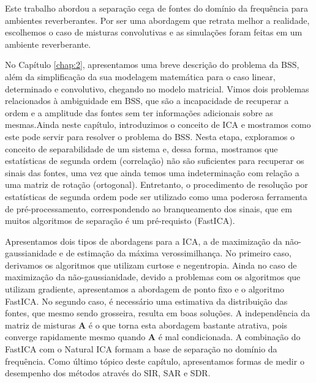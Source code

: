 \label{chap:5}
Este trabalho abordou a separação cega de fontes do domínio da frequência para ambientes reverberantes. Por ser uma abordagem que retrata melhor a realidade, escolhemos o caso de misturas convolutivas e as simulações foram feitas em um ambiente reverberante.

No Capítulo \ref{chap:2}, apresentamos uma breve descrição do problema da BSS, além da simplificação da sua modelagem matemática para o caso linear, determinado e convolutivo, chegando no modelo matricial. Vimos dois problemas relacionados à ambiguidade em BSS, que são a incapacidade de recuperar a ordem e a amplitude das fontes sem ter informações adicionais sobre as mesmas.Ainda neste capítulo, introduzimos o conceito de ICA e mostramos como este pode servir para resolver o problema do BSS. Nesta etapa, exploramos o conceito de separabilidade de um sistema e, dessa forma, mostramos que estatísticas de segunda ordem (correlação) não são suficientes para recuperar os sinais das fontes, uma vez que ainda temos uma indeterminação com relação a uma matriz de rotação (ortogonal). Entretanto, o procedimento de resolução por estatísticas de segunda ordem pode ser utilizado como uma poderosa ferramenta de pré-processamento, correspondendo ao branqueamento dos sinais, que em muitos algoritmos de separação é um pré-requisto (FastICA). 

Apresentamos dois tipos de abordagens para a ICA, a de maximização da não-gaussianidade e de estimação da máxima verossimilhança. No primeiro caso, derivamos os algoritmos que utilizam curtose e negentropia. Ainda no caso de maximização da não-gaussianidade, devido a problemas com os algoritmos que utilizam gradiente, apresentamos a abordagem de ponto fixo e o algoritmo FastICA. No segundo caso, é necessário uma estimativa da distribuição das fontes, que mesmo sendo grosseira, resulta em boas soluções. A independência da matriz de misturas $\mathbf{A}$ é o que torna esta abordagem bastante atrativa, pois converge rapidamente mesmo quando $\mathbf{A}$ é mal condicionada. A combinação do FastICA com o Natural ICA formam a base de separação no domínio da frequência. Como último tópico deste capítulo, apresentamos formas de medir o desempenho dos métodos através do SIR, SAR e SDR.

